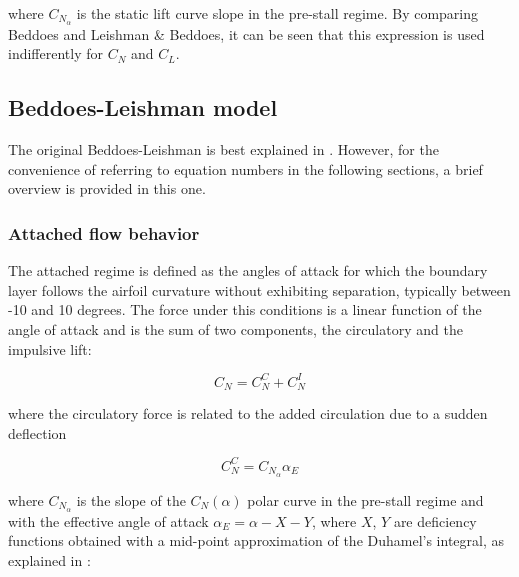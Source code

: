 \noindent where $C_{N_\alpha}$ is the static lift curve slope in the pre-stall regime. By comparing Beddoes \cite{beddoes_representation_1983} and Leishman \& Beddoes, it can be seen that this expression is used indifferently for $C_N$ and $C_L$.

\iffalse
\begin{tikzpicture}[
	nonterminal/.style={
		rectangle,
		minimumsize=6mm,
		very thick,
		draw=black,
		color=white,						
	}]
	\node [nonterminal] {\alpha}
\end{tikzpicture}
\fi

\subsection{Beddoes-Leishman model}

The original Beddoes-Leishman is best explained in \autocite{tank_possibility_2017}. However, for the convenience of referring to equation numbers in the following sections, a brief overview is provided in this one. 

\subsubsection{Attached flow behavior}

The attached regime is defined as the angles of attack for which the boundary layer follows the airfoil curvature without exhibiting separation, typically between -10 and 10 degrees. The force under this conditions is a linear function of the angle of attack and is the sum of two components, the circulatory and the impulsive lift: 

\begin{equation}
C_N = C_N^C + C_N^I
\end{equation}

\noindent where the circulatory force is related to the added circulation due to a sudden deflection

\begin{equation}
C_N^C = C_{N_\alpha} \alpha_{E}
\label{eq:circulatory}
\end{equation}

\noindent where $C_{N_\alpha}$ is the slope of the $C_N(\alpha)$ polar curve in the pre-stall regime and with the effective angle of attack $\alpha_E = \alpha - X - Y$, where $X$, $Y$ are deficiency functions obtained with a mid-point approximation of the Duhamel's integral, as explained in \autocite{leishman_principles_2006}:

